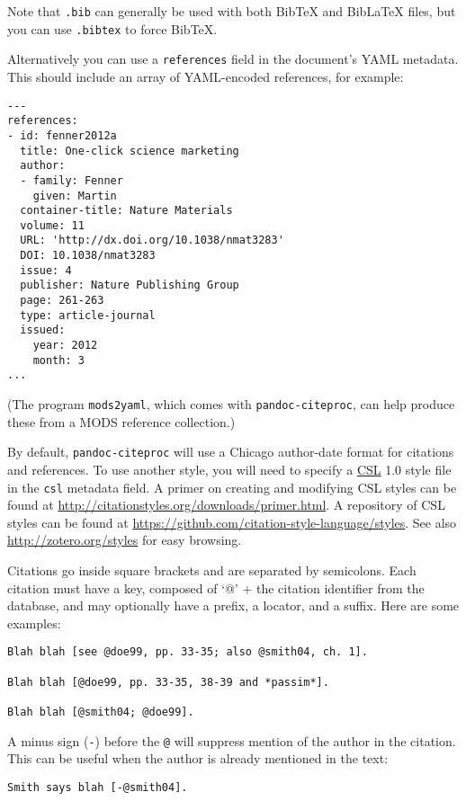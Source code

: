\documentclass[]{article}
\begin{document}
Note that \texttt{.bib} can generally be used with both BibTeX and
BibLaTeX files, but you can use \texttt{.bibtex} to force BibTeX.

Alternatively you can use a \texttt{references} field in the document's
YAML metadata. This should include an array of YAML-encoded references,
for example:

\begin{verbatim}
---
references:
- id: fenner2012a
  title: One-click science marketing
  author:
  - family: Fenner
    given: Martin
  container-title: Nature Materials
  volume: 11
  URL: 'http://dx.doi.org/10.1038/nmat3283'
  DOI: 10.1038/nmat3283
  issue: 4
  publisher: Nature Publishing Group
  page: 261-263
  type: article-journal
  issued:
    year: 2012
    month: 3
...
\end{verbatim}

(The program \texttt{mods2yaml}, which comes with
\texttt{pandoc-citeproc}, can help produce these from a MODS reference
collection.)

By default, \texttt{pandoc-citeproc} will use a Chicago author-date
format for citations and references. To use another style, you will need
to specify a \href{http://CitationStyles.org}{CSL} 1.0 style file in the
\texttt{csl} metadata field. A primer on creating and modifying CSL
styles can be found at
\url{http://citationstyles.org/downloads/primer.html}. A repository of
CSL styles can be found at
\url{https://github.com/citation-style-language/styles}. See also
\url{http://zotero.org/styles} for easy browsing.

Citations go inside square brackets and are separated by semicolons.
Each citation must have a key, composed of `@' + the citation identifier
from the database, and may optionally have a prefix, a locator, and a
suffix. Here are some examples:

\begin{verbatim}
Blah blah [see @doe99, pp. 33-35; also @smith04, ch. 1].

Blah blah [@doe99, pp. 33-35, 38-39 and *passim*].

Blah blah [@smith04; @doe99].
\end{verbatim}

A minus sign (\texttt{-}) before the \texttt{@} will suppress mention of
the author in the citation. This can be useful when the author is
already mentioned in the text:

\begin{verbatim}
Smith says blah [-@smith04].
\end{verbatim}
\end{document}
